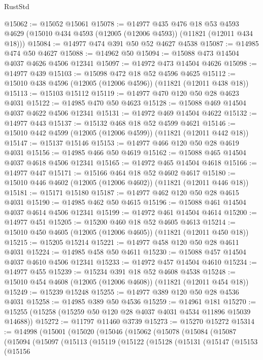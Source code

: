 \begin{lexlean}{RustStd}
\begin{coremodule}
@15062 := @15052 @15061
@15078 := @14977
    @435
    @476
    @18
    @53
    @4593
    @4629
    (@15010 @434 @4593 (@12005 (@12006 @4593)) (@11821 (@12011 @434 @18)))
@15084 := @14977 @474 @391 @50 @52 @4627 @4538
@15087 := @14985 @474 @50 @4627
@15088 := @14962 @50
@15094 := @15088 @473 @14504 @4037 @4626 @4506 @12341
@15097 := @14972 @473 @14504 @4626
@15098 := @14977 @439
@15103 := @15098 @472 @18 @52 @4596 @4625
@15112 := @15010 @438 @4596 (@12005 (@12006 @4596)) (@11821 (@12011 @438 @18))
@15113 := @15103 @15112
@15119 := @14977 @470 @120 @50 @28 @4623 @4031
@15122 := @14985 @470 @50 @4623
@15128 := @15088 @469 @14504 @4037 @4622 @4506 @12341
@15131 := @14972 @469 @14504 @4622
@15132 := @14977 @443
@15137 := @15132 @468 @18 @52 @4599 @4621
@15146 := @15010 @442 @4599 (@12005 (@12006 @4599)) (@11821 (@12011 @442 @18))
@15147 := @15137 @15146
@15153 := @14977 @466 @120 @50 @28 @4619 @4031
@15156 := @14985 @466 @50 @4619
@15162 := @15088 @465 @14504 @4037 @4618 @4506 @12341
@15165 := @14972 @465 @14504 @4618
@15166 := @14977 @447
@15171 := @15166 @464 @18 @52 @4602 @4617
@15180 := @15010 @446 @4602 (@12005 (@12006 @4602)) (@11821 (@12011 @446 @18))
@15181 := @15171 @15180
@15187 := @14977 @462 @120 @50 @28 @4615 @4031
@15190 := @14985 @462 @50 @4615
@15196 := @15088 @461 @14504 @4037 @4614 @4506 @12341
@15199 := @14972 @461 @14504 @4614
@15200 := @14977 @451
@15205 := @15200 @460 @18 @52 @4605 @4613
@15214 := @15010 @450 @4605 (@12005 (@12006 @4605)) (@11821 (@12011 @450 @18))
@15215 := @15205 @15214
@15221 := @14977 @458 @120 @50 @28 @4611 @4031
@15224 := @14985 @458 @50 @4611
@15230 := @15088 @457 @14504 @4037 @4610 @4506 @12341
@15233 := @14972 @457 @14504 @4610
@15234 := @14977 @455
@15239 := @15234 @391 @18 @52 @4608 @4538
@15248 := @15010 @454 @4608 (@12005 (@12006 @4608)) (@11821 (@12011 @454 @18))
@15249 := @15239 @15248
@15255 := @14977 @389 @120 @50 @28 @4536 @4031
@15258 := @14985 @389 @50 @4536
@15259 := @14961 @181
@15270 := @15255 (@15258 (@15259 @50 @120 @28 @4037 @4031 @4534 @11896 @15039 @14688))
@15272 := @11797 @11460 @3739
@15273 := @15270 @15272
@15314 := @14998
    (@15001
      (@15020
        (@15046
          (@15062
            (@15078
              (@15084
                (@15087
                  (@15094
                    (@15097
                      (@15113
                        (@15119
                          (@15122
                            (@15128
                              (@15131
                                (@15147
                                  (@15153
                                    (@15156

\end{coremodule}
\end{lexlean}
